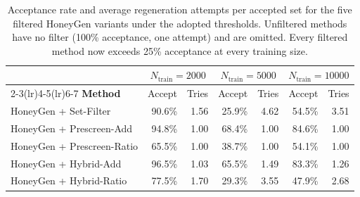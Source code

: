 \begin{table}[t]
  \centering
  \begin{tabular}{lrrrrrr}
    \toprule
    & \multicolumn{2}{c}{$N_{\text{train}}{=}2000$}
    & \multicolumn{2}{c}{$N_{\text{train}}{=}5000$}
    & \multicolumn{2}{c}{$N_{\text{train}}{=}10000$} \\
    \cmidrule(lr){2-3}\cmidrule(lr){4-5}\cmidrule(lr){6-7}
    \textbf{Method} & Accept & Tries & Accept & Tries & Accept & Tries \\
    \midrule
    HoneyGen + Set-Filter & 90.6\% & 1.56 & 25.9\% & 4.62 & 54.5\% & 3.51 \\
    HoneyGen + Prescreen-Add & 94.8\% & 1.00 & 68.4\% & 1.00 & 84.6\% & 1.00 \\
    HoneyGen + Prescreen-Ratio & 65.5\% & 1.00 & 38.7\% & 1.00 & 54.1\% & 1.00 \\
    HoneyGen + Hybrid-Add & 96.5\% & 1.03 & 65.5\% & 1.49 & 83.3\% & 1.26 \\
    HoneyGen + Hybrid-Ratio & 77.5\% & 1.70 & 29.3\% & 3.55 & 47.9\% & 2.68 \\
    \bottomrule
  \end{tabular}
  \caption{Acceptance rate and average regeneration attempts per accepted
  set for the five filtered HoneyGen variants under the adopted thresholds.
  Unfiltered methods have no filter (100\% acceptance, one attempt) and are
  omitted. Every filtered method now exceeds 25\% acceptance at every
  training size.}
  \label{tab:accept}
\end{table}

